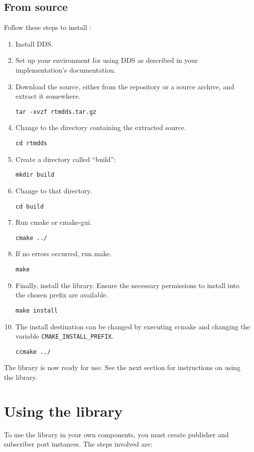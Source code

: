 \documentclass[a4paper,10pt]{article}
\newcommand{\ilcode}[1]{\lstinline|#1|}
\begin{document}
\subsection{From source}

Follow these steps to install :

\begin{enumerate}
  \item Install DDS.

  \item Set up your environment for using DDS as described in your
  implementation's documentation.

  \item Download the source, either from the repository or a source archive,
  and extract it somewhere.

  \ilcode{tar -xvzf rtmdds.tar.gz}
  \item Change to the directory containing the extracted source.

  \ilcode{cd rtmdds}
  \item Create a directory called ``build'':

  \ilcode{mkdir build}
  \item Change to that directory.

  \ilcode{cd build}
  \item Run cmake or cmake-gui.

  \ilcode{cmake ../}
  \item If no errors occurred, run make.

  \ilcode{make}
  \item Finally, install the library. Ensure the necessary permissions
  to install into the chosen prefix are available.

  \ilcode{make install}
  \item The install destination can be changed by executing ccmake and
  changing the variable \ilcode{CMAKE_INSTALL_PREFIX}.

  \ilcode{ccmake ../}
\end{enumerate}

The library is now ready for use. See the next section for instructions on
using the library.

\section{Using the library}
\label{sec:usage}

To use the library in your own components, you must create publisher and
subscriber port instances. The steps involved are:
\end{document}

